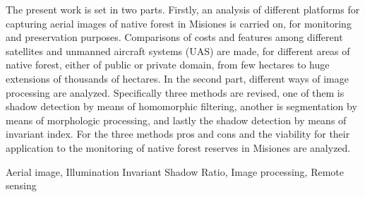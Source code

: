 The present work is set in two parts. Firstly, an analysis of different platforms for capturing aerial images of native forest in Misiones is carried on, for monitoring and preservation purposes. Comparisons of costs and features among different satellites and unmanned aircraft systems (UAS) are made, for different areas of native forest, either of public or private domain, from few hectares to huge extensions of thousands of hectares. In the second part, different ways of image processing are analyzed. Specifically three methods are revised, one of them is shadow detection by means of homomorphic filtering, another is segmentation by means of morphologic processing, and lastly the shadow detection by means of invariant index. For the three methods pros and cons and the viability for their application to the monitoring of native forest reserves in Misiones are analyzed. \\
\begin{keywords}
    Aerial image, Illumination Invariant Shadow Ratio, Image processing, Remote sensing
\end{keywords}    %


